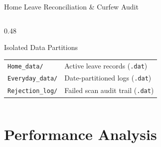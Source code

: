 \documentclass[aspectratio=169, 11pt]{beamer}
\begin{document}
\begin{frame}{Home Leave Reconciliation \& Curfew Audit}
\begin{columns}[T]
\begin{column}{0.48\textwidth}
      \vspace{0.2em}
      \begin{block}{Isolated Data Partitions}
        \small
        \begin{tabular}{ll}
          \texttt{Home\_data/} & Active leave records (\texttt{.dat}) \\
          \texttt{Everyday\_data/} & Date-partitioned logs (\texttt{.dat}) \\
          \texttt{Rejection\_log/} & Failed scan audit trail (\texttt{.dat}) \\
        \end{tabular}
      \end{block}
    \end{column}
  \end{columns}
\end{frame}

\section{Performance Analysis}
\end{document}
